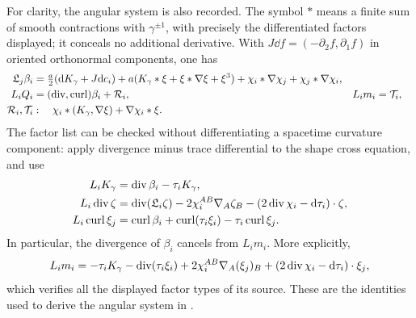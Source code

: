 For clarity, the angular system is also recorded.  The symbol $*$
means a finite sum of smooth contractions with $\gamma^{\pm1}$,
with precisely the differentiated factors displayed; it conceals no
additional derivative.  With $J\dd f=(-\partial_2f,\partial_1f)$ in
oriented orthonormal components, one has
\begin{equation}\label{dn:D3}
\begin{aligned}
 \mathfrak L_j\beta_i
 &=\tfrac a2(\mathrm d K_\gamma+J\mathrm d c_i)
       +a(K_\gamma*\xi+\xi*\nabla\xi+\xi^3)
       +\chi_i*\nabla\chi_j+\chi_j*\nabla\chi_i,\\
 L_iQ_i&=(\operatorname{div},\operatorname{curl})\beta_i+\mathcal R_i,
       &L_im_i&=\mathcal T_i,\\
 \mathcal R_i,\mathcal T_i
 &:\quad\chi_i*(K_\gamma,\nabla\xi)+\nabla\chi_i*\xi.
\end{aligned}
\end{equation}
The factor list can be checked without differentiating a spacetime
curvature component: apply divergence minus trace differential to the
shape cross equation, and use
\begin{align*}
 L_iK_\gamma&=\operatorname{div}\beta_i-\tau_iK_\gamma,\\
 L_i\operatorname{div}\zeta
 &=\operatorname{div}(\mathfrak L_i\zeta)
      -2\chi_i^{AB}\nabla_A\zeta_B
      -(2\operatorname{div}\chi_i-\mathrm d\tau_i)\cdot\zeta,\\
 L_i\operatorname{curl}\xi_j
 &=\operatorname{curl}\beta_i+\operatorname{curl}(\tau_i\xi_i)-\tau_i\operatorname{curl}\xi_j.
\end{align*}
In particular, the divergence of $\beta_i$ cancels from $L_im_i$.
More explicitly,
\[
 L_im_i=-\tau_iK_\gamma-\operatorname{div}(\tau_i\xi_i)
       +2\chi_i^{AB}\nabla_A(\xi_j)_B
       +(2\operatorname{div}\chi_i-\mathrm d\tau_i)\cdot\xi_j,
\]
which verifies all the displayed factor types of its source.
These are the identities used to derive the angular system in
\cite[]{KerrCTwo}.

